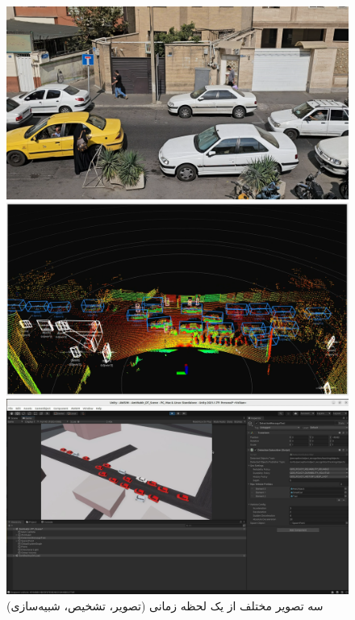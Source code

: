  \begin{figure}[h!]
    \centering
    \begin{minipage}{0.8\textwidth}
        \includegraphics[width=1\linewidth]{figures/Rasht_Video_Frame_3D_Detection.png}
    \end{minipage}
    \vspace{0.3cm}
    \begin{minipage}{0.8\textwidth}
        \includegraphics[width=1\linewidth]{figures/Rasht_Calibrated_3D_Detection.png}
    \end{minipage}
    \vspace{0.3cm}
    \begin{minipage}{0.8\textwidth}
        \includegraphics[width=1\linewidth]{figures/Amirkabir_Traffic_Simulation.png}
    \end{minipage}
    \caption{سه تصویر مختلف از یک لحظه زمانی (تصویر، تشخیص، شبیه‌سازی)}
    \label{fig:Digital_Twin_Frame}
\end{figure}